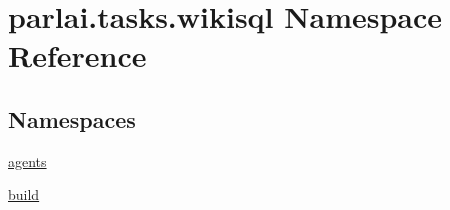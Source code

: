 \hypertarget{namespaceparlai_1_1tasks_1_1wikisql}{}\section{parlai.\+tasks.\+wikisql Namespace Reference}
\label{namespaceparlai_1_1tasks_1_1wikisql}
\subsection*{Namespaces}
\begin{DoxyCompactItemize}
\item 
 \hyperlink{namespaceparlai_1_1tasks_1_1wikisql_1_1agents}{agents}
\item 
 \hyperlink{namespaceparlai_1_1tasks_1_1wikisql_1_1build}{build}
\end{DoxyCompactItemize}
